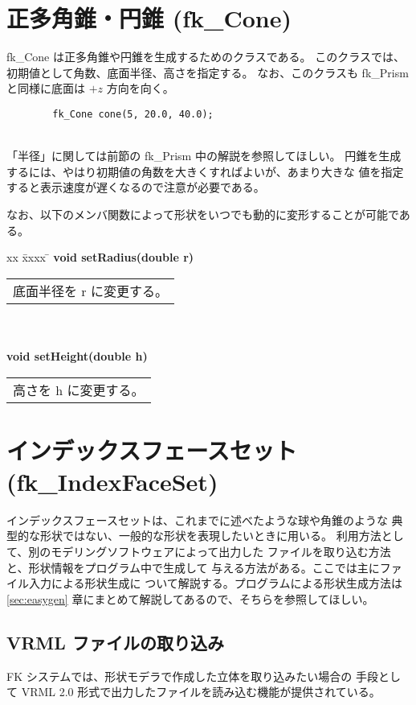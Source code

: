 \section{正多角錐・円錐 (fk\_Cone)}
fk\_Cone は正多角錐や円錐を生成するためのクラスである。
このクラスでは、初期値として角数、底面半径、高さを指定する。
なお、このクラスも fk\_Prism と同様に底面は \(+z\) 方向を向く。
\\
\begin{screen}
\begin{verbatim}
        fk_Cone cone(5, 20.0, 40.0);
\end{verbatim}
\end{screen}
~ \\
「半径」に関しては前節の fk\_Prism 中の解説を参照してほしい。
円錐を生成するには、やはり初期値の角数を大きくすればよいが、あまり大きな
値を指定すると表示速度が遅くなるので注意が必要である。

なお、以下のメンバ関数によって形状をいつでも動的に変形することが可能である。

\begin{tabbing}
xx \= xxxx \= \kill
\> \textbf{void setRadius(double r)} \\
	\> \> \begin{tabular}{p{15cm}}
		底面半径を r に変更する。
	\end{tabular} \\ \\

\> \textbf{void setHeight(double h)} \\
	\> \> \begin{tabular}{p{15cm}}
		高さを h に変更する。
	\end{tabular}
\end{tabbing}

\section{インデックスフェースセット (fk\_IndexFaceSet)}
インデックスフェースセットは、これまでに述べたような球や角錐のような
典型的な形状ではない、一般的な形状を表現したいときに用いる。
利用方法として、別のモデリングソフトウェアによって出力した
ファイルを取り込む方法と、形状情報をプログラム中で生成して
与える方法がある。ここでは主にファイル入力による形状生成に
ついて解説する。プログラムによる形状生成方法は
\ref{sec:easygen} 章にまとめて解説してあるので、そちらを参照してほしい。

\subsection{VRML ファイルの取り込み}
FK システムでは、形状モデラで作成した立体を取り込みたい場合の
手段として VRML 2.0 形式で出力したファイルを読み込む機能が提供されている。

